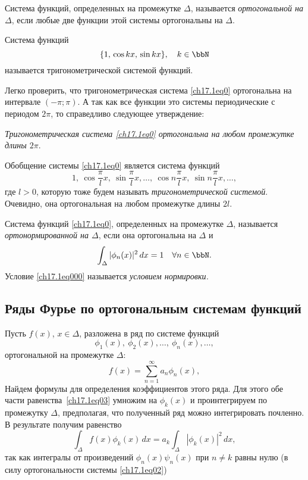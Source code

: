 \begin{defn}
Система функций, определенных на промежутке $\Delta$, называется \textit{ортогональной на $\Delta$}, если любые две функции этой системы ортогональны на $\Delta$.
\end{defn}

\begin{defn}
Система функций 
\begin{equation} \label{ch17.1eq0}
\{1,\, \cos kx,\, \sin kx\}, \quad k\in \bbN
\end{equation}
называется тригонометрической системой функций.			
\end{defn}
Легко проверить, что тригонометрическая система \eqref{ch17.1eq0} ортогональна на интервале $(-\pi;\pi)$. А так как все функции это системы периодические с периодом $2\pi$, то справедливо следующее утверждение:

\textit{Тригонометрическая система \eqref{ch17.1eq0} ортогональна на любом промежутке длины $2\pi$}.	

Обобщение системы \eqref{ch17.1eq0} является система функций
$$
1,\ \cos \frac{\pi}{l}x,\ \sin \frac{\pi}{l}x,\ldots,\ \cos n\frac{\pi}{l}x,\ \sin n\frac{\pi}{l}x,\ldots,
$$
где $l>0$, которую тоже будем называть \textit{тригонометрической системой}. Очевидно, она ортогональная на любом промежутке длины $2l$.
\begin{defn}
Система функций \eqref{ch17.1eq0}, определенных на промежутке $\Delta$, называется \textit{ортонормированной на $\Delta$}, если она ортогональна на $\Delta$ и 
\begin{equation} \label{ch17.1eq000}
\int _\Delta{|\phi_n(x)|^2\,dx=1} \quad \forall n \in \bbN.
\end{equation}
Условие \eqref{ch17.1eq000} называется \textit{условием нормировки.}
\end{defn}

\subsection{Ряды Фурье по ортогональным системам функций}

Пусть $f(x)$, $x \in \Delta$, разложена в ряд по системе функций
\begin{equation} \label{ch17.1eq02}
\phi_1(x), \ \phi_2(x), \ldots,\ \phi_n(x), \ldots,
\end{equation}
ортогональной на промежутке $\Delta$:
\begin{equation} \label{ch17.1eq03}
f(x)= \sum_{n = 1}^{\infty} a_n \phi_n(x),
\end{equation}
Найдем формулы для определения коэффициентов этого ряда. Для этого обе части равенства~\eqref{ch17.1eq03} умножим на $\phi_k(x)$ и проинтегрируем по промежутку $\Delta$, предполагая, что полученный ряд можно интегрировать почленно. В результате получим равенство
$$
\int_\Delta{f(x) \phi_k(x)}\,dx=a_k\int_\Delta|\phi_k(x)|^2\,dx,
$$
так как интегралы от произведений $\phi_n(x)\psi_n(x)$ при $n\ne k$ равны нулю (в силу ортогональности системы \eqref{ch17.1eq02})

